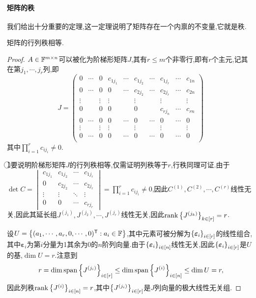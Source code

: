 \documentclass[openany]{book}
\begin{document}
\paragraph{矩阵的秩}
我们给出十分重要的定理,这一定理说明了矩阵存在一个内禀的不变量,它就是秩.
\begin{theorem}
    矩阵的行列秩相等.
\end{theorem}
\begin{proof}
    $A\in\mathbb{F}^{m\times n}$可以被化为阶梯形矩阵$J$,其有$r\leq m$个非零行,即有$r$个主元,记其在第$j_1,\cdots,j_r$列,即
    $$J=\begin{pmatrix}
        0 & \cdots & 0 & c_{1j_1} & \cdots & c_{1j_2} & \cdots & c_{1j_r} & \cdots & c_{1n} \\
        0 & \cdots & 0 & 0 & \cdots & c_{2 j_2} & \cdots & c_{2 j_r} & \cdots & c_{2 n} \\
        \vdots &   & \vdots & \vdots &   & \vdots &   & \vdots &   &\vdots \\
        0 &   & 0 & 0 &   & 0 &   & c_{rj_n} & \cdots & c_{rn} \\
        0 & \cdots & 0 & 0 & \cdots & 0 & \cdots & 0 & \cdots & 0 \\
        \vdots &   & \vdots & \vdots &   & \vdots &   & \vdots &   &\vdots \\
        0 & \cdots & 0 & 0 & \cdots & 0 & \cdots & 0 & \cdots & 0 \\
    \end{pmatrix}$$
    其中$\prod_{i=1}^{r}c_{ij_i}\neq 0$.
    
    \textcircled{1}要说明阶梯形矩阵$J$的行列秩相等,仅需证明列秩等于$r$,行秩同理可证.由于$\det C=\begin{vmatrix}
        c_{1j_1}&c_{1j_2}&\cdots&c_{1j_r}\\
        0&c_{2j_2}&\cdots&c_{2j_r}\\
        \vdots&\vdots&\ddots&\vdots\\
        0&0&\cdots&c_{rj_r}
    \end{vmatrix}=\prod_{i=1}^{r}c_{ij_i}\neq 0$,因此$C^{(1)},C^{(2)},\cdots,C^{(r)}$线性无关,因此其延长组$J^{(j_1)},J^{(j_2)},\cdots,J^{(j_r)}$线性无关,因此$\operatorname{rank}\left\{J^{(j_k)}\right\}_{k\in [r]}=r$.

    设$U=\left\{(a_1,\cdots,a_r,0,\cdots,0)^{\mathsf{T}}:a_i\in\mathbb{F}\right\}$,其中元素可被分解为$\left\{\bm{\varepsilon}_i\right\}_{i\in [r]}$的线性组合,其中$\bm{\varepsilon}_i$为第$i$分量为1其余为0的$n$阶列向量.由于$\left\{\bm{\varepsilon}_i\right\}_{i\in [n]}$线性无关,因此$\left\{\bm{\varepsilon}_i\right\}_{i\in [r]}$是$U$的基,$\dim U=r$.注意到
    $$r=\dim\mathrm{span}\left\{J^{(j_i)}\right\}_{i\in [r]}\leq \dim \mathrm{span}\left\{J^{(i)}\right\}_{i\in [n]}\leq \dim U=r,$$
    因此列秩$\operatorname{rank} \left\{J^{(i)}\right\}_{i\in [n]}=r$,其中$\left\{J^{(j_i)}\right\}_{i\in [r]}$是$J$列向量的极大线性无关组.


\end{proof}
\end{document}
